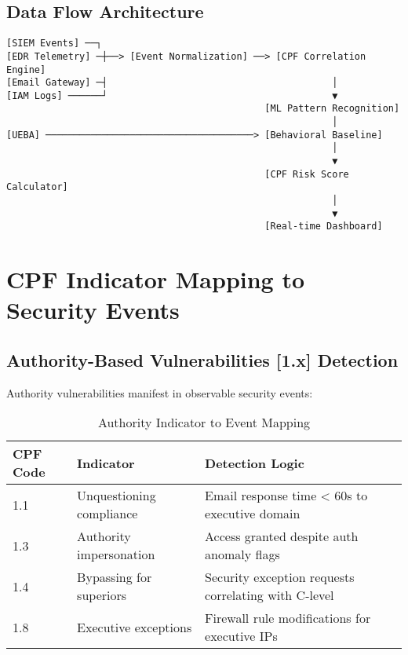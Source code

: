 \documentclass[11pt,a4paper]{article}
\begin{document}
\subsection{Data Flow Architecture}

\begin{verbatim}
[SIEM Events] ──┐
[EDR Telemetry] ─┼──> [Event Normalization] ──> [CPF Correlation Engine]
[Email Gateway] ─┤                                        │
[IAM Logs] ──────┘                                        ▼
                                              [ML Pattern Recognition]
                                                          │
[UEBA] ─────────────────────────────────────> [Behavioral Baseline]
                                                          │
                                                          ▼
                                              [CPF Risk Score Calculator]
                                                          │
                                                          ▼
                                              [Real-time Dashboard]
\end{verbatim}

\section{CPF Indicator Mapping to Security Events}

\subsection{Authority-Based Vulnerabilities [1.x] Detection}

Authority vulnerabilities manifest in observable security events:

\begin{table}[H]
\centering
\caption{Authority Indicator to Event Mapping}
\begin{tabular}{p{1.5cm}p{5cm}p{6cm}}
\toprule
CPF Code & Indicator & Detection Logic \\
\midrule
1.1 & Unquestioning compliance & Email response time < 60s to executive domain \\
1.3 & Authority impersonation & Access granted despite auth anomaly flags \\
1.4 & Bypassing for superiors & Security exception requests correlating with C-level \\
1.8 & Executive exceptions & Firewall rule modifications for executive IPs \\
\bottomrule
\end{tabular}
\end{table}
\end{document}
